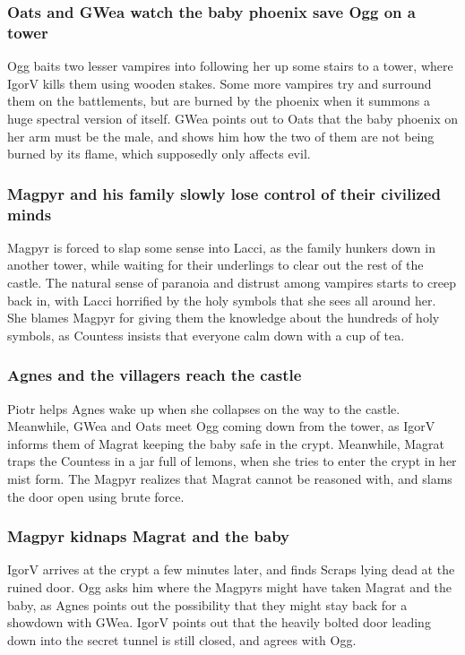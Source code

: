 \subsubsection{\Gls{Oats} and \Gls{GWea} watch the baby phoenix save \Gls{Ogg} on a tower}
\Gls{Ogg} baits two lesser vampires into following her up some stairs to a tower, where \Gls{IgorV}
kills them using wooden stakes. Some more vampires try and surround them on the battlements, but
are burned by the phoenix when it summons a huge spectral version of itself. \Gls{GWea} points out
to \Gls{Oats} that the baby phoenix on her arm must be the male, and shows him how the two of them
are not being burned by its flame, which supposedly only affects evil.

\subsubsection{\Gls{Magpyr} and his family slowly lose control of their civilized minds}
\Gls{Magpyr} is forced to slap some sense into \Gls{Lacci}, as the family hunkers down in another
tower, while waiting for their underlings to clear out the rest of the castle. The natural sense
of paranoia and distrust among vampires starts to creep back in, with \Gls{Lacci} horrified by
the holy symbols that she sees all around her. She blames \Gls{Magpyr} for giving them the
knowledge about the hundreds of holy symbols, as \Gls{Countess} insists that everyone calm down
with a cup of tea.

\subsubsection{\Gls{Agnes} and the villagers reach the castle}
\Gls{Piotr} helps \Gls{Agnes} wake up when she collapses on the way to the castle. Meanwhile,
\Gls{GWea} and \Gls{Oats} meet \Gls{Ogg} coming down from the tower, as \Gls{IgorV} informs them
of \Gls{Magrat} keeping the baby safe in the crypt. Meanwhile, \Gls{Magrat} traps the \Gls{Countess}
in a jar full of lemons, when she tries to enter the crypt in her mist form. The \Gls{Magpyr}
realizes that \Gls{Magrat} cannot be reasoned with, and slams the door open using brute force.

\subsubsection{\Gls{Magpyr} kidnaps \Gls{Magrat} and the baby}
\Gls{IgorV} arrives at the crypt a few minutes later, and finds \Gls{Scraps} lying dead at the
ruined door. \Gls{Ogg} asks him where the Magpyrs might have taken \Gls{Magrat} and the baby,
as \Gls{Agnes} points out the possibility that they might stay back for a showdown with \Gls{GWea}.
\Gls{IgorV} points out that the heavily bolted door leading down into the secret tunnel is still
closed, and agrees with \Gls{Ogg}.

